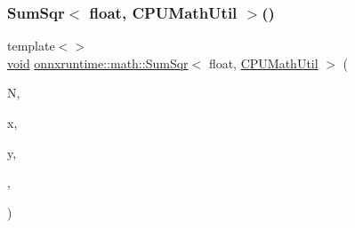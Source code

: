 \subsubsection{\texorpdfstring{Sum\+Sqr$<$ float, C\+P\+U\+Math\+Util $>$()}{SumSqr< float, CPUMathUtil >()}}
{\footnotesize\ttfamily template$<$$>$ \\
\mbox{\hyperlink{mlasi_8h_a88f941d423cb2a819b70a1358982b1a6}{void}} \mbox{\hyperlink{namespaceonnxruntime_1_1math_a12689bd88fd703f49d1a2d0002bdf515}{onnxruntime\+::math\+::\+Sum\+Sqr}}$<$ float, \mbox{\hyperlink{classonnxruntime_1_1CPUMathUtil}{C\+P\+U\+Math\+Util}} $>$ (\begin{DoxyParamCaption}\item[{const int}]{N,  }\item[{const float $\ast$}]{x,  }\item[{float $\ast$}]{y,  }\item[{\mbox{\hyperlink{classonnxruntime_1_1CPUMathUtil}{C\+P\+U\+Math\+Util}} $\ast$}]{,  }\item[{\mbox{\hyperlink{classonnxruntime_1_1Tensor}{Tensor}} $\ast$}]{ }\end{DoxyParamCaption})}

